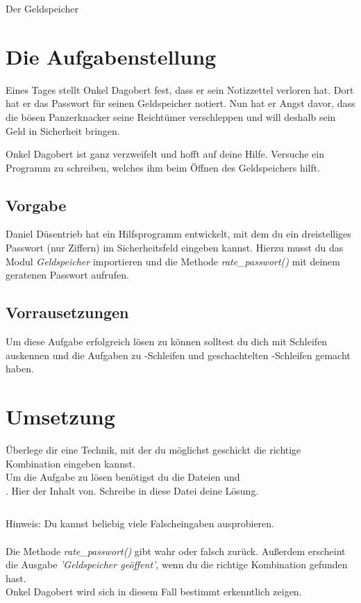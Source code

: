 \documentclass{\VorlagenPfad/coderdojokatext}
\newcommand{\Titel}{Der Geldspeicher}
\begin{document}
	\setcounter{chapter}{1}
	
	\begin{center}
		{\huge \Titel}
	\end{center}
	
	\section{Die Aufgabenstellung} Eines Tages stellt Onkel Dagobert fest, dass er sein Notizzettel verloren hat. Dort hat er das Passwort für seinen Geldspeicher notiert. Nun hat er Angst davor, dass die bösen Panzerknacker seine Reichtümer verschleppen und will deshalb sein Geld in Sicherheit bringen.
	
	Onkel Dagobert ist ganz verzweifelt und hofft auf deine Hilfe. Versuche ein Programm zu schreiben, welches ihm beim Öffnen des Geldspeichers hilft.
	
	\subsection{Vorgabe} Daniel Düsentrieb hat ein Hilfsprogramm entwickelt, mit dem du ein dreistelliges Passwort (nur Ziffern) im Sicherheitsfeld eingeben kannst. Hierzu musst du das Modul \emph{Geldspeicher} importieren und die Methode \emph{rate\_passwort()} mit deinem geratenen Passwort aufrufen.
	
	\subsection{Vorrausetzungen} Um diese Aufgabe erfolgreich lösen zu können solltest du dich mit Schleifen auskennen und die Aufgaben zu -Schleifen und geschachtelten -Schleifen gemacht haben.
	
	\section{Umsetzung}
	Überlege dir eine Technik, mit der du möglichst geschickt die richtige Kombination eingeben kannst.\\
	Um die Aufgabe zu lösen benötigst du die Dateien  und \\
	. Hier der Inhalt von. Schreibe in diese Datei deine Lösung.	
	\inputminted{python}{code/geldspeicher_test.py}
	
	Hinweis: Du kannst beliebig viele Falscheingaben ausprobieren.\\
	\\
	Die Methode \emph{rate\_passwort()} gibt wahr oder falsch zurück. Außerdem erscheint die Ausgabe \emph{'Geldspeicher geöffent'}, wenn du die richtige Kombination gefunden hast.
	\\
	Onkel Dagobert wird sich in diesem Fall bestimmt erkenntlich zeigen.
	
\end{document}
